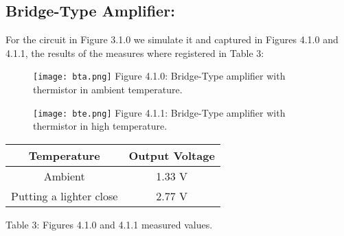 \subsection{Bridge-Type Amplifier:}

For the circuit in Figure 3.1.0 we simulate it and captured in Figures 4.1.0 and 4.1.1, the results of the measures where registered in Table 3:

\begin{figure}[H]
\texttt{[image: bta.png]}
\centering \linebreak \linebreak Figure 4.1.0: Bridge-Type amplifier with thermistor in ambient temperature.
\end{figure} \hfill

\begin{figure}[H]
\texttt{[image: bte.png]}
\centering \linebreak \linebreak Figure 4.1.1: Bridge-Type amplifier with thermistor in high temperature.
\end{figure} \hfill

\begin{center}
\begin{tabular}{c c}
\toprule \toprule
\hspace{80px} Temperature \hspace{80px} & \hspace{80px} Output Voltage \hspace{80px} \\
\midrule \midrule
Ambient & 1.33 V \\
\cmidrule{1-2}
Putting a lighter close & 2.77 V \\
\bottomrule
\end{tabular}
\linebreak \linebreak Table 3: Figures 4.1.0 and 4.1.1 measured values.
\end{center}

\pagebreak